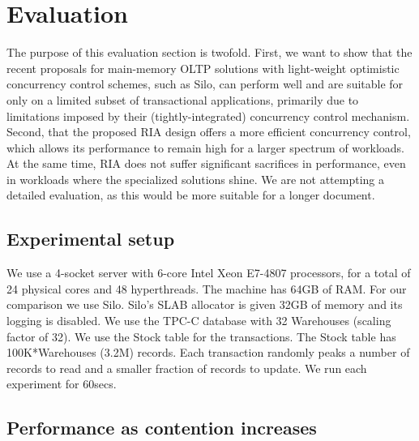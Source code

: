 
\section{Evaluation}

The purpose of this evaluation section is twofold.  First, we want to show that the recent proposals for main-memory OLTP solutions with light-weight optimistic concurrency control schemes, such as Silo, can perform well and are suitable for only on a limited subset of transactional applications, primarily due to limitations imposed by their (tightly-integrated) concurrency control mechanism.  Second, that the proposed RIA design offers a more efficient concurrency control, which allows its performance to remain high for a larger spectrum of workloads.  At the same time, RIA does not suffer significant sacrifices in performance, even in workloads where the specialized solutions shine.  We are not attempting a detailed evaluation, as this would be more suitable for a longer document.

\subsection{Experimental setup}

We use a 4-socket server with 6-core Intel Xeon E7-4807 processors, for a total of 24 physical cores and 48 hyperthreads. The machine has 64GB of RAM. 
For our comparison we use Silo.  Silo's SLAB allocator is given 32GB of memory and its logging is disabled. We use the TPC-C database with 32 Warehouses (scaling factor of 32). We use the Stock table for the transactions.  The Stock table has 100K*Warehouses (3.2M) records. Each transaction randomly peaks a number of records to read and a smaller fraction of records to update.  We run each experiment for 60secs.



\subsection{Performance as contention increases}

